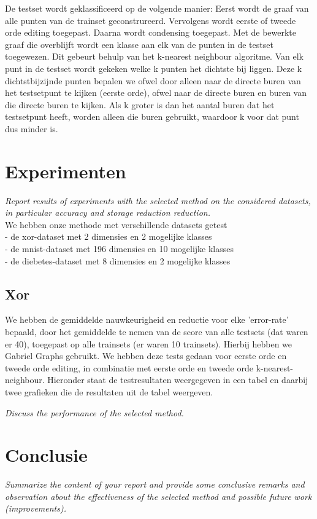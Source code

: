 \documentclass{article}
\begin{document}
De testset wordt geklassificeerd op de volgende manier: Eerst wordt de graaf van alle punten van de trainset  geconstrureerd. Vervolgens wordt eerste of tweede orde editing toegepast. Daarna wordt condensing toegepast. Met de bewerkte graaf die overblijft wordt een klasse aan elk van de punten in de testset toegewezen. Dit gebeurt behulp van het k-nearest neighbour algoritme. Van elk punt in de testset wordt gekeken welke k punten het dichtste bij liggen. Deze k dichtstbijzijnde punten bepalen we ofwel door alleen naar de directe buren van het testsetpunt te kijken (eerste orde), ofwel naar de directe buren en buren van die directe buren te kijken. Als k groter is dan het aantal buren dat het testsetpunt heeft, worden alleen die buren gebruikt, waardoor k voor dat punt dus minder is.

\section{Experimenten}
\emph{Report results of experiments with the selected method on the considered datasets, 
in particular accuracy and storage reduction reduction. }\\

We hebben onze methode met verschillende datasets getest\\ %
- de xor-dataset met 2 dimensies en 2 mogelijke klasses\\
- de mnist-dataset met 196 dimensies en 10 mogelijke klasses\\
- de diebetes-dataset met 8 dimensies en 2 mogelijke klasses\\

\subsection{Xor}
We hebben de gemiddelde nauwkeurigheid en reductie voor elke 'error-rate' bepaald, door het gemiddelde te nemen van de score van alle testsets (dat waren er 40), toegepast op alle trainsets (er waren 10 trainsets). Hierbij hebben we Gabriel Graphs gebruikt. We hebben deze tests gedaan voor eerste orde en tweede orde editing, in combinatie met eerste orde en tweede orde k-nearest-neighbour. Hieronder staat de testresultaten weergegeven in een tabel en daarbij twee grafieken die de resultaten uit de tabel weergeven.

\emph{Discuss the performance of the selected method.}\\



\section{Conclusie}
\emph{Summarize the content of your report and provide some conclusive remarks and observation about the effectiveness of the selected method and possible future work (improvements).} \\
\end{document}
